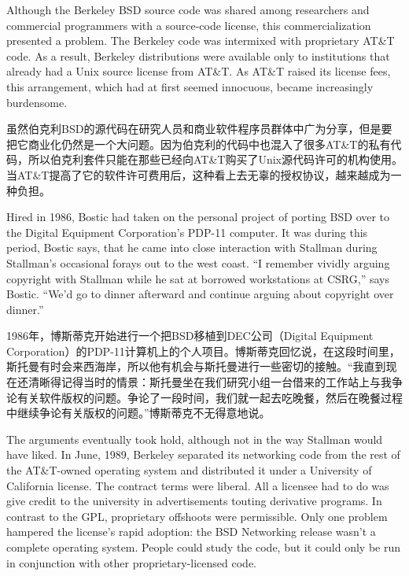 \ifdefined\eng
Although the Berkeley BSD source code was shared among researchers and commercial programmers with a source-code license, this commercialization presented a problem. The Berkeley code was intermixed with proprietary AT\&T code. As a result, Berkeley distributions were available only to institutions that already had a Unix source license from AT\&T. As AT\&T raised its license fees, this arrangement, which had at first seemed innocuous, became increasingly burdensome.
\fi

\ifdefined\chs
虽然伯克利BSD的源代码在研究人员和商业软件程序员群体中广为分享，但是要把它商业化仍然是一个大问题。因为伯克利的代码中也混入了很多AT\&T的私有代码，所以伯克利套件只能在那些已经向AT\&T购买了Unix源代码许可的机构使用。当AT\&T提高了它的软件许可费用后，这种看上去无辜的授权协议，越来越成为一种负担。
\fi

\ifdefined\eng
Hired in 1986, Bostic had taken on the personal project of porting BSD over to the Digital Equipment Corporation's PDP-11 computer. It was during this period, Bostic says, that he came into close interaction with Stallman during Stallman's occasional forays out to the west coast. ``I remember vividly arguing copyright with Stallman while he sat at borrowed workstations at CSRG,'' says Bostic. ``We'd go to dinner afterward and continue arguing about copyright over dinner.''
\fi

\ifdefined\chs
1986年，博斯蒂克开始进行一个把BSD移植到DEC公司（Digital Equipment Corporation）的PDP-11计算机上的个人项目。博斯蒂克回忆说，在这段时间里，斯托曼有时会来西海岸，所以他有机会与斯托曼进行一些密切的接触。``我直到现在还清晰得记得当时的情景：斯托曼坐在我们研究小组一台借来的工作站上与我争论有关软件版权的问题。争论了一段时间，我们就一起去吃晚餐，然后在晚餐过程中继续争论有关版权的问题。''博斯蒂克不无得意地说。
\fi

\ifdefined\eng
The arguments eventually took hold, although not in the way Stallman would have liked. In June, 1989, Berkeley separated its networking code from the rest of the AT\&T-owned operating system and distributed it under a University of California license. The contract terms were liberal. All a licensee had to do was give credit to the university in advertisements touting derivative programs. In contrast to the GPL, proprietary offshoots were permissible. Only one problem hampered the license's rapid adoption: the BSD Networking release wasn't a complete operating system. People could study the code, but it could only be run in conjunction with other proprietary-licensed code.
\fi

